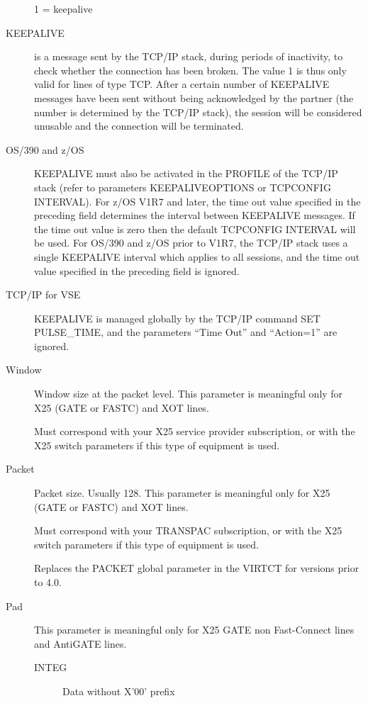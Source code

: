 \documentclass[letterpaper,10pt,english]{sphinxmanual}
\begin{document}
\begin{description}
1 = keepalive

\item[{KEEPALIVE}] \leavevmode
is a message sent by the TCP/IP stack, during periods of inactivity,
to check whether the connection has been broken. The value 1 is thus
only valid for lines of type TCP. After a certain number of
KEEPALIVE messages have been sent without being acknowledged by the
partner (the number is determined by the TCP/IP stack), the session
will be considered unusable and the connection will be terminated.

\item[{OS/390 and z/OS}] \leavevmode
KEEPALIVE must also be activated in the PROFILE of the TCP/IP stack
(refer to parameters KEEPALIVEOPTIONS or TCPCONFIG INTERVAL). For
z/OS V1R7 and later, the time out value specified in the preceding
field determines the interval between KEEPALIVE messages. If the
time out value is zero then the default TCPCONFIG INTERVAL will be
used. For OS/390 and z/OS prior to V1R7, the TCP/IP stack uses a
single KEEPALIVE interval which applies to all sessions, and the
time out value specified in the preceding field is ignored.

\item[{TCP/IP for VSE}] \leavevmode
KEEPALIVE is managed globally by the TCP/IP command SET PULSE\_TIME,
and the parameters “Time Out” and “Action=1” are ignored.

\item[{Window}] \leavevmode
Window size at the packet level. This parameter is meaningful only
for X25 (GATE or FASTC) and XOT lines.

Must correspond with your X25 service provider subscription, or with
the X25 switch parameters if this type of equipment is used.

\item[{Packet}] \leavevmode
Packet size. Usually 128. This parameter is meaningful only for X25
(GATE or FASTC) and XOT lines.

Must correspond with your TRANSPAC subscription, or with the X25
switch parameters if this type of equipment is used.

Replaces the PACKET global parameter in the VIRTCT for versions
prior to 4.0.

\item[{Pad}] \leavevmode
This parameter is meaningful only for X25 GATE non Fast-Connect
lines and AntiGATE lines.
\begin{description}
\item[{INTEG}] \leavevmode
Data without X’00’ prefix


\end{description}
\end{description}
\end{document}
